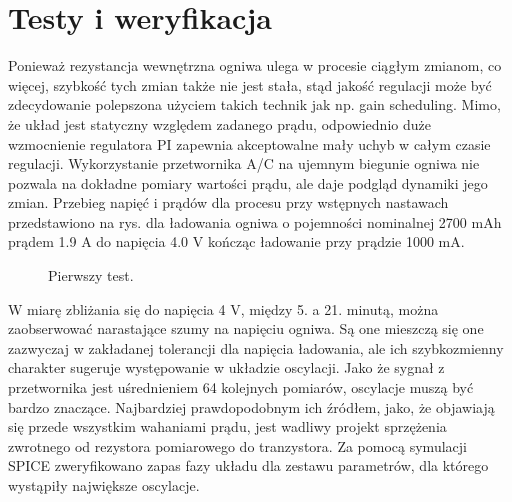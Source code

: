 \documentclass[polish,engineer]{polsl-msth}
\begin{document}
\chapter{Testy i weryfikacja}

Ponieważ rezystancja wewnętrzna ogniwa ulega w procesie ciągłym zmianom, co więcej, szybkość tych zmian także nie jest stała, stąd jakość regulacji może być zdecydowanie polepszona użyciem takich technik jak np. gain scheduling.
Mimo, że układ jest statyczny względem zadanego prądu, odpowiednio duże wzmocnienie regulatora PI zapewnia akceptowalne mały uchyb w całym czasie regulacji. 
Wykorzystanie przetwornika A/C na ujemnym biegunie ogniwa nie pozwala na dokładne pomiary wartości prądu, ale daje podgląd dynamiki jego zmian. Przebieg napięć i prądów dla procesu przy wstępnych nastawach przedstawiono na rys. dla ładowania ogniwa o pojemności nominalnej 2700 mAh prądem 1.9 A do napięcia 4.0 V kończąc ładowanie przy prądzie 1000 mA.
\begin{figure}[hbtp]
     \caption{Pierwszy test. \label{img:1strun}}
\end{figure}
W miarę zbliżania się do napięcia 4 V, między 5. a 21. minutą, można zaobserwować narastające szumy na napięciu ogniwa. Są one mieszczą się one zazwyczaj w zakładanej tolerancji dla napięcia ładowania, ale ich szybkozmienny charakter sugeruje występowanie w układzie oscylacji. Jako że sygnał z przetwornika jest uśrednieniem 64 kolejnych pomiarów, oscylacje muszą być bardzo znaczące.
Najbardziej prawdopodobnym ich źródłem, jako, że objawiają się przede wszystkim wahaniami prądu, jest wadliwy projekt sprzężenia zwrotnego od rezystora pomiarowego do tranzystora. Za pomocą symulacji SPICE zweryfikowano zapas fazy układu dla zestawu parametrów, dla którego wystąpiły największe oscylacje.
\end{document}
